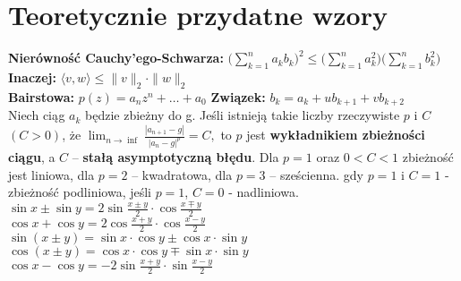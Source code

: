\documentclass[a4paper,twocolumn]{article}
\begin{document}
\section{Teoretycznie przydatne wzory}

\textbf{Nierówność Cauchy'ego-Schwarza:} $ \Big(\sum_{k=1}^{n} a_k b_k\Big)^2 \leq \Big(\sum_{k=1}^{n} a_k^2\Big)\Big(\sum_{k=1}^{n} b_k^2\Big) $ \\
\textbf{Inaczej:} $\langle v, w\rangle \leq \|v\|_2\cdot \|w\|_2$\\
\textbf{Bairstowa:} $p(z)=a_nz^n+\dots+a_0$
\textbf{Związek:} $b_k=a_k+ub_{k+1}+vb_{k+2}$\\
Niech ciąg $a_k$ będzie zbieżny do g. Jeśli istnieją takie liczby rzeczywiste $p$ i $C$ $(C > 0)$, że
$\lim_{n \rightarrow \inf}{\frac{|{a_{n+1}-g}|}{|{a_n - g}|^p}} = C, $
to $p$ jest \textbf{wykładnikiem zbieżności ciągu}, a $C$ – \textbf{stałą
asymptotyczną błędu}. Dla $p = 1$ oraz $0 < C < 1$ zbieżność jest
liniowa, dla $p = 2$ – kwadratowa, dla $p = 3$ – sześcienna.
gdy $p = 1$ i $C = 1$ - zbieżność podliniowa, jeśli $p = 1$, $C = 0$ - nadliniowa.\\
${\displaystyle \sin x\pm \sin y=2\sin {\frac {x\pm y}{2}}\cdot \cos {\frac {x\mp y}{2}}} $\\
$\cos x+\cos y=2\cos {\frac  {x+y}2}\cdot \cos {\frac  {x-y}2}$\\
${\displaystyle \sin(x\pm y)=\sin x\cdot \cos y\pm \cos x\cdot \sin y}$\\
${\displaystyle \cos(x\pm y)=\cos x\cdot \cos y\mp \sin x\cdot \sin y} $\\
$\cos x-\cos y=-2\sin {\frac  {x+y}2}\cdot \sin {\frac  {x-y}2}$
\end{document}
